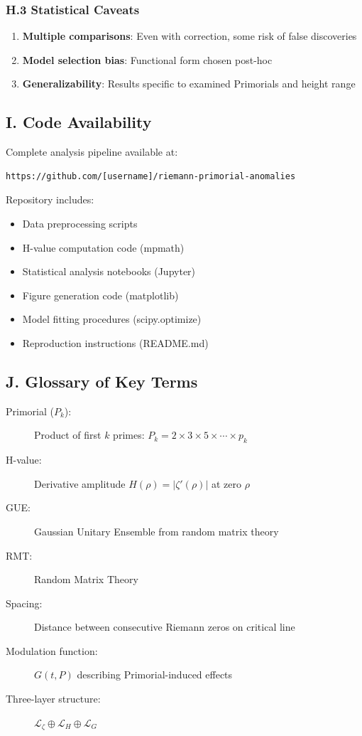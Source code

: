 \documentclass[12pt]{article}
\begin{document}
\subsubsection*{H.3 Statistical Caveats}

\begin{enumerate}
\item \textbf{Multiple comparisons}: Even with correction, some risk of false discoveries
\item \textbf{Model selection bias}: Functional form chosen post-hoc
\item \textbf{Generalizability}: Results specific to examined Primorials and height range
\end{enumerate}

\subsection*{I. Code Availability}

Complete analysis pipeline available at:
\begin{verbatim}
https://github.com/[username]/riemann-primorial-anomalies
\end{verbatim}

Repository includes:
\begin{itemize}
\item Data preprocessing scripts
\item H-value computation code (mpmath)
\item Statistical analysis notebooks (Jupyter)
\item Figure generation code (matplotlib)
\item Model fitting procedures (scipy.optimize)
\item Reproduction instructions (README.md)
\end{itemize}

\subsection*{J. Glossary of Key Terms}

\begin{description}
\item[Primorial ($P_k$):] Product of first $k$ primes: $P_k = 2 \times 3 \times 5 \times \cdots \times p_k$
\item[H-value:] Derivative amplitude $H(\rho) = |\zeta'(\rho)|$ at zero $\rho$
\item[GUE:] Gaussian Unitary Ensemble from random matrix theory
\item[RMT:] Random Matrix Theory
\item[Spacing:] Distance between consecutive Riemann zeros on critical line
\item[Modulation function:] $G(t,P)$ describing Primorial-induced effects
\item[Three-layer structure:] $\mathcal{L}_{\zeta} \oplus \mathcal{L}_H \oplus \mathcal{L}_G$
\end{description}
\end{document}
